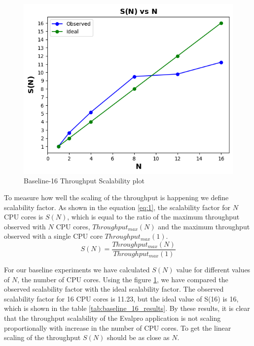 \documentclass{iitbreport}
\begin{document}
\begin{figure}[!htb]
  \centering
  \includegraphics[width=\linewidth]{Images/Baseline-16_scalability.png}
  \caption{Baseline-16 Throughput Scalability plot}
  \label{baseline_scalability_plot}
\end{figure}

To measure how well the scaling of the throughput is happening we define scalability factor. As shown in the equation \ref{eq:1}, the scalability factor for $N$ CPU cores is  $S(N)$, which is equal to the ratio of the maximum throughput observed with $N$ CPU cores,  $Throughput_{max}(N)$ and the maximum throughput observed with a single CPU core $Throughput_{max}(1)$.
\begin{equation}
  S(N)=\frac{Throughput_{max}(N)}{Throughput_{max}(1)}
  \label{eq:1}
\end{equation}

For our baseline experiments we have calculated $S(N)$ value for different values of $N$, the number of CPU cores. Using the figure \ref{baseline_scalability_plot}, we have compared the observed scalability factor with the ideal scalability factor. The observed scalability factor for 16 CPU cores is 11.23, but the ideal value of S(16) is 16, which is shown in the table \ref{tab:baseline_16_results}. By these results, it is clear that the throughput scalability of the Evalpro application is not scaling proportionally with increase in the number of CPU cores. To get the linear scaling of the throughput  $S(N)$ should be as close as $N$.
\end{document}
